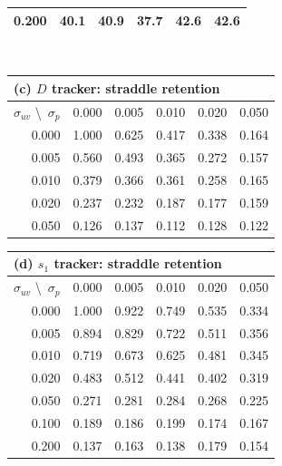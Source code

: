 \documentclass[lettersize,journal]{IEEEtran}
\begin{document}
\begin{table}[!t]
\begin{tabular}{r|rrrrr}
0.200 &  40.1 & 40.9 & 37.7 & 42.6 & 42.6 \\
\hline
\end{tabular}
\\[8pt]
\begin{tabular}{r|rrrrr}
\multicolumn{6}{l}{(c) $D$ tracker: straddle retention} \\
\hline
$\sigma_{uv}$ \textbackslash\ $\sigma_p$ & 0.000 & 0.005 & 0.010 & 0.020 & 0.050 \\
\hline
0.000 & 1.000 & 0.625 & 0.417 & 0.338 & 0.164 \\
0.005 & 0.560 & 0.493 & 0.365 & 0.272 & 0.157 \\
0.010 & 0.379 & 0.366 & 0.361 & 0.258 & 0.165 \\
0.020 & 0.237 & 0.232 & 0.187 & 0.177 & 0.159 \\
0.050 & 0.126 & 0.137 & 0.112 & 0.128 & 0.122 \\
\hline
\end{tabular}
\hspace{1.5em}
\begin{tabular}{r|rrrrr}
\multicolumn{6}{l}{(d) $s_1$ tracker: straddle retention} \\
\hline
$\sigma_{uv}$ \textbackslash\ $\sigma_p$ & 0.000 & 0.005 & 0.010 & 0.020 & 0.050 \\
\hline
0.000 & 1.000 & 0.922 & 0.749 & 0.535 & 0.334 \\
0.005 & 0.894 & 0.829 & 0.722 & 0.511 & 0.356 \\
0.010 & 0.719 & 0.673 & 0.625 & 0.481 & 0.345 \\
0.020 & 0.483 & 0.512 & 0.441 & 0.402 & 0.319 \\
0.050 & 0.271 & 0.281 & 0.284 & 0.268 & 0.225 \\
0.100 & 0.189 & 0.186 & 0.199 & 0.174 & 0.167 \\
0.200 & 0.137 & 0.163 & 0.138 & 0.179 & 0.154 \\
\hline
\end{tabular}
\end{table}
\end{document}
